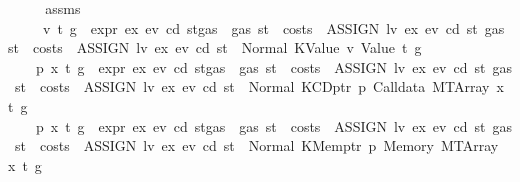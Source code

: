 \begin{isabellebody}
%
\isadelimproof
%
\endisadelimproof
%
\isatagproof
{}\isamarkupfalse%
\ {\isacharminus}{\kern0pt}\isanewline
\ \ \isamarkupfalse%
\ assms\ \isamarkupfalse%
\isanewline
\ \ \ \ {\isacharparenleft}{\kern0pt}{}{\isacharparenright}{\kern0pt}\ v\ t\ g\ \ {\isachardoublequoteopen}expr\ ex\ ev\ cd\ {\isacharparenleft}{\kern0pt}st{\isasymlparr}gas\ {\isacharcolon}{\kern0pt}{\isacharequal}{\kern0pt}\ gas\ st\ {\isacharminus}{\kern0pt}\ costs\ \ {\isacharparenleft}{\kern0pt}ASSIGN\ lv\ ex{\isacharparenright}{\kern0pt}\ ev\ cd\ st{\isasymrparr}{\isacharparenright}{\kern0pt}\ {\isacharparenleft}{\kern0pt}gas\ st\ {\isacharminus}{\kern0pt}\ costs\ \ {\isacharparenleft}{\kern0pt}ASSIGN\ lv\ ex{\isacharparenright}{\kern0pt}\ ev\ cd\ st{\isacharparenright}{\kern0pt}\ {\isacharequal}{\kern0pt}\ Normal\ {\isacharparenleft}{\kern0pt}{\isacharparenleft}{\kern0pt}KValue\ v{\isacharcomma}{\kern0pt}\ Value\ t{\isacharparenright}{\kern0pt}{\isacharcomma}{\kern0pt}\ g{\isacharparenright}{\kern0pt}{\isachardoublequoteclose}\isanewline
\ \ {\isacharbar}{\kern0pt}\ {\isacharparenleft}{\kern0pt}{}{\isacharparenright}{\kern0pt}\ p\ x\ t\ g\ \ {\isachardoublequoteopen}expr\ ex\ ev\ cd\ {\isacharparenleft}{\kern0pt}st{\isasymlparr}gas\ {\isacharcolon}{\kern0pt}{\isacharequal}{\kern0pt}\ gas\ st\ {\isacharminus}{\kern0pt}\ costs\ \ {\isacharparenleft}{\kern0pt}ASSIGN\ lv\ ex{\isacharparenright}{\kern0pt}\ ev\ cd\ st{\isasymrparr}{\isacharparenright}{\kern0pt}\ {\isacharparenleft}{\kern0pt}gas\ st\ {\isacharminus}{\kern0pt}\ costs\ \ {\isacharparenleft}{\kern0pt}ASSIGN\ lv\ ex{\isacharparenright}{\kern0pt}\ ev\ cd\ st{\isacharparenright}{\kern0pt}\ {\isacharequal}{\kern0pt}\ Normal\ {\isacharparenleft}{\kern0pt}{\isacharparenleft}{\kern0pt}KCDptr\ p{\isacharcomma}{\kern0pt}\ Calldata\ {\isacharparenleft}{\kern0pt}MTArray\ x\ t{\isacharparenright}{\kern0pt}{\isacharparenright}{\kern0pt}{\isacharcomma}{\kern0pt}\ g{\isacharparenright}{\kern0pt}{\isachardoublequoteclose}\isanewline
\ \ {\isacharbar}{\kern0pt}\ {\isacharparenleft}{\kern0pt}{}{\isacharparenright}{\kern0pt}\ p\ x\ t\ g\ \ {\isachardoublequoteopen}expr\ ex\ ev\ cd\ {\isacharparenleft}{\kern0pt}st{\isasymlparr}gas\ {\isacharcolon}{\kern0pt}{\isacharequal}{\kern0pt}\ gas\ st\ {\isacharminus}{\kern0pt}\ costs\ \ {\isacharparenleft}{\kern0pt}ASSIGN\ lv\ ex{\isacharparenright}{\kern0pt}\ ev\ cd\ st{\isasymrparr}{\isacharparenright}{\kern0pt}\ {\isacharparenleft}{\kern0pt}gas\ st\ {\isacharminus}{\kern0pt}\ costs\ \ {\isacharparenleft}{\kern0pt}ASSIGN\ lv\ ex{\isacharparenright}{\kern0pt}\ ev\ cd\ st{\isacharparenright}{\kern0pt}\ {\isacharequal}{\kern0pt}\ Normal\ {\isacharparenleft}{\kern0pt}{\isacharparenleft}{\kern0pt}KMemptr\ p{\isacharcomma}{\kern0pt}\ Memory\ {\isacharparenleft}{\kern0pt}MTArray\ x\ t{\isacharparenright}{\kern0pt}{\isacharparenright}{\kern0pt}{\isacharcomma}{\kern0pt}\ g{\isacharparenright}{\kern0pt}{\isachardoublequoteclose}\isanewline

\end{isabellebody}
